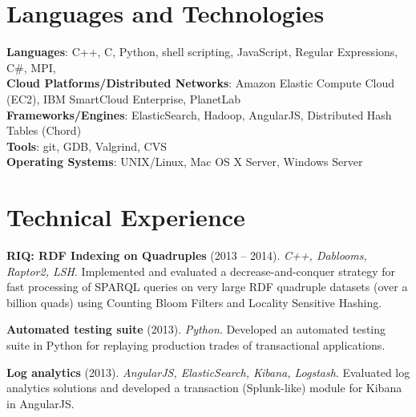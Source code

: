 \documentclass[margin,line]{resume}
\begin{document}
\begin{resume}
    \begin{position}
    \vspace{-2mm}
    \end{position}

    \section{\mysidestyle Languages and Technologies} 

    \textbf{Languages}: C++, C, Python, shell scripting, JavaScript, Regular Expressions, C\#, MPI, \LaTeXe\\
    \textbf{Cloud Platforms/Distributed Networks}: Amazon Elastic Compute Cloud (EC2), IBM SmartCloud Enterprise, PlanetLab\\
    \textbf{Frameworks/Engines}: ElasticSearch, Hadoop, AngularJS, Distributed Hash Tables (Chord)\\
    \textbf{Tools}: git, GDB, Valgrind, CVS\\
    \textbf{Operating Systems}: {\sc UNIX}/Linux, Mac OS X Server, Windows Server
    
    \section{\mysidestyle Technical Experience}
    \textbf{RIQ: RDF Indexing on Quadruples} (2013 -- 2014). \textsl{C++, Dablooms, Raptor2, LSH}. Implemented and evaluated a decrease-and-conquer strategy for fast processing of SPARQL queries on very large RDF quadruple datasets  (over a billion quads) using Counting Bloom Filters and Locality Sensitive Hashing.
    
    \vspace{-2mm}
    \textbf{Automated testing suite} (2013). \textsl{Python}. Developed an automated testing suite in Python for replaying production trades of transactional applications.
    
   \vspace{-2mm}
    \textbf{Log analytics} (2013). \textsl{AngularJS, ElasticSearch, Kibana, Logstash}. Evaluated log analytics solutions and developed a transaction (Splunk-like) module for Kibana in AngularJS.


\end{resume}
\end{document}
